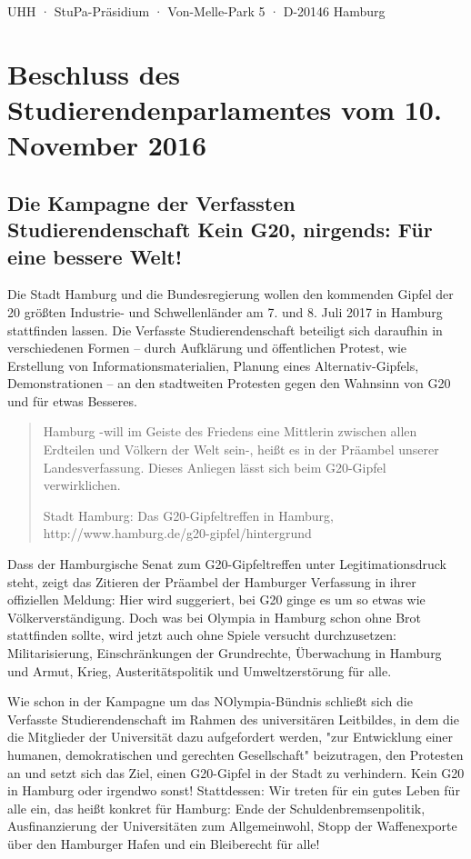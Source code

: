 \documentclass[ngerman,headheight=70pt]{scrartcl}
\begin{document}
    UHH · StuPa-Präsidium · Von-Melle-Park 5 · D-20146 Hamburg

    \section*{Beschluss des Studierendenparlamentes vom 10. November 2016}
    \subsection*{Die Kampagne der Verfassten Studierendenschaft
    Kein G20, nirgends: Für eine bessere Welt!}

    Die Stadt Hamburg und die Bundesregierung wollen den kommenden Gipfel der
    20 größten Industrie- und Schwellenländer am 7. und 8. Juli 2017 in Hamburg
    stattfinden lassen. Die Verfasste Studierendenschaft beteiligt sich
    daraufhin in verschiedenen Formen -- durch Aufklärung und öffentlichen Protest,
    wie Erstellung von Informationsmaterialien, Planung eines Alternativ-Gipfels,
    Demonstrationen -- an den stadtweiten Protesten gegen den Wahnsinn von G20
    und für etwas Besseres.

    \blockquote[Stadt Hamburg: Das G20-Gipfeltreffen in Hamburg, http://www.hamburg.de/g20-gipfel/hintergrund]{
    Hamburg -will im Geiste des Friedens eine Mittlerin zwischen
    allen Erdteilen und Völkern der Welt sein-, heißt es in der Präambel unserer
    Landesverfassung. Dieses Anliegen lässt sich beim G20-Gipfel verwirklichen.}

    Dass der Hamburgische Senat zum G20-Gipfeltreffen unter Legitimationsdruck
    steht, zeigt das Zitieren der Präambel der Hamburger Verfassung in ihrer
    offiziellen Meldung: Hier wird suggeriert, bei G20 ginge es um so etwas wie
    Völkerverständigung. Doch was bei Olympia in Hamburg schon ohne Brot
    stattfinden sollte, wird jetzt auch ohne Spiele versucht durchzusetzen:
    Militarisierung, Einschränkungen der Grundrechte, Überwachung in Hamburg und
    Armut, Krieg, Austeritätspolitik und Umweltzerstörung für alle.

    Wie schon in der Kampagne um das NOlympia-Bündnis schließt sich die Verfasste
    Studierendenschaft im Rahmen des universitären Leitbildes, in dem die die
    Mitglieder der Universität dazu aufgefordert werden, "zur Entwicklung einer
    humanen, demokratischen und gerechten Gesellschaft" beizutragen, den Protesten
    an und setzt sich das Ziel, einen G20-Gipfel in der Stadt zu verhindern. Kein
    G20 in Hamburg oder irgendwo sonst! Stattdessen: Wir treten für ein gutes
    Leben für alle ein, das heißt konkret für Hamburg: Ende der
    Schuldenbremsenpolitik, Ausfinanzierung der Universitäten zum Allgemeinwohl,
    Stopp der Waffenexporte über den Hamburger Hafen und ein Bleiberecht für alle!
\end{document}
